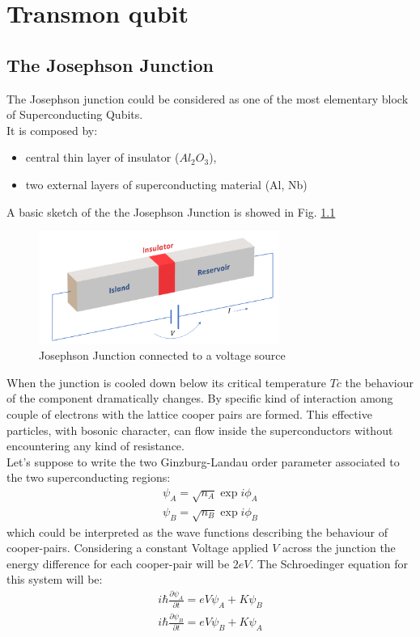 

\chapter{Transmon qubit}

\section{The Josephson Junction}
The Josephson junction could be considered as one of the most elementary block of Superconducting Qubits. \\
It is composed by:
\begin{itemize}
    \itemsep0em 
    \item central thin layer of insulator ($Al_{2}O_{3}$),
    \item two external layers of superconducting material (Al, Nb)
\end{itemize}
A basic sketch of the the Josephson Junction is showed in Fig. \ref{fig:jj1}

\begin{figure}[h]
\centering
\includegraphics[width=0.7\textwidth]{pic/transmon/jj1.png}
\caption{Josephson Junction connected to a voltage source}
\label{fig:jj1}
\end{figure}

When the junction is cooled down below its critical temperature $Tc$ the behaviour of the component dramatically changes. By specific kind of interaction among couple of electrons with the lattice cooper pairs are formed. This effective particles, with bosonic character, can flow inside the superconductors without encountering any kind of resistance.\\
Let's suppose to write the two Ginzburg-Landau order parameter associated to the two superconducting regions:
\begin{equation}\begin{split}
\psi_{A} = \sqrt{n_{A}}\exp{i\phi_{A}}\\
\psi_{B} = \sqrt{n_{B}}\exp{i\phi_{B}}
\end{split}\end{equation}
which could be interpreted as the wave functions describing the behaviour of cooper-pairs. Considering a constant Voltage applied $V$ across the junction the energy difference for each cooper-pair will be $2eV$.
The Schroedinger equation for this system will be:
\begin{equation}
    \begin{split}
        i\hbar\frac{\partial \psi_{A}}{\partial t} = eV\psi_{A} + K\psi_{B}\\
        i\hbar\frac{\partial \psi_{B}}{\partial t} = eV\psi_{B} + K\psi_{A}
    \end{split}
\end{equation}

